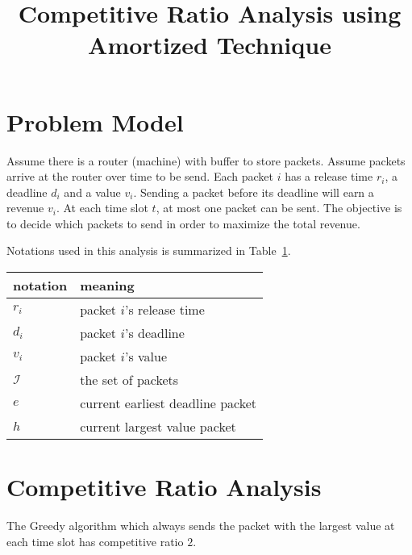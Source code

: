 \documentclass[10 pt,final]{article}
\begin{document}
\title{Competitive Ratio Analysis using Amortized Technique}
\date{}
\maketitle


\section{Problem Model}
Assume there is a router (machine) with buffer to store packets. Assume packets arrive at the router over time to be send. Each packet $i$ has a release time $r_i$, a deadline $d_i$ and a value $v_i$. Sending a packet before its deadline will earn a revenue $v_i$. At each time slot $t$, at most one packet can be sent. The objective is to decide which packets to send in order to maximize the total revenue.

Notations used in this analysis is summarized in Table~\ref{tb_notation}.

\begin{table}[ht!]
\centering
\begin{tabular}{|l|l|}
\hline
notation & meaning \\ \hline
\hline
$r_i$ & packet $i$'s release time \\ \hline
$d_i$ & packet $i$'s deadline \\ \hline
$v_i$ & packet $i$'s value \\ \hline
$\mathcal{I}$ & the set of packets \\ \hline
$e$ & current earliest deadline packet \\ \hline
$h$ & current largest value packet \\ \hline
\end{tabular}
\label{tb_notation}
\end{table}



\section{Competitive Ratio Analysis}
\begin{lemma} The Greedy algorithm which always sends the packet with the largest value at each time slot has competitive ratio $2$.
\end{lemma}
\end{document}
